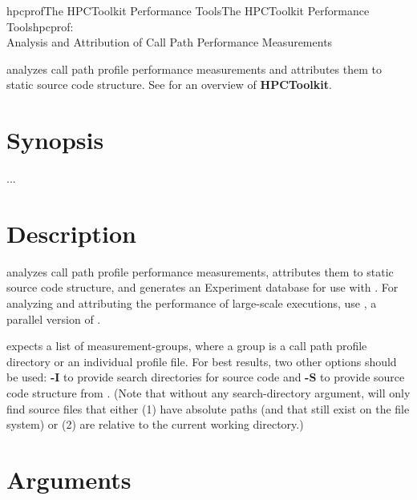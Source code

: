 \documentclass[english]{article}
\begin{document}
\begin{Name}{1}{hpcprof}{The HPCToolkit Performance Tools}{The HPCToolkit Performance Tools}{hpcprof:\\ Analysis and Attribution of Call Path Performance Measurements}

 analyzes call path profile performance measurements and attributes them to static source code structure.
See  for an overview of \textbf{HPCToolkit}.

\end{Name}

\section{Synopsis}

  ...

\section{Description}

 analyzes call path profile performance measurements, attributes them to static source code structure, and generates an Experiment database for use with .
For analyzing and attributing the performance of large-scale executions, use , a parallel version of .

 expects a list of measurement-groups, where a group is a call path profile directory or an individual profile file.
For best results, two other options should be used: \textbf{-I} to provide search directories for source code and \textbf{-S} to provide source code structure from .
(Note that without any search-directory argument,  will only find source files that either (1) have absolute paths (and that still exist on the file system) or (2) are relative to the current working directory.)


\section{Arguments}
\end{document}
